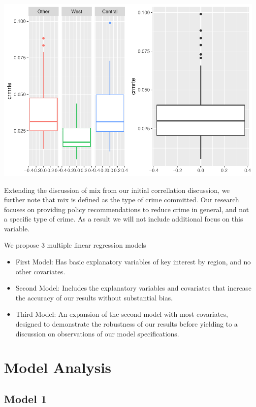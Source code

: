 \documentclass[]{article}
\begin{document}
\includegraphics{Bagnard_Gaustad_Hartman_Leung_Lab_3_files/figure-latex/unnamed-chunk-44-1.pdf}

Extending the discussion of mix from our initial correllation
discussion, we further note that mix is defined as the type of crime
committed. Our research focuses on providing policy recommendations to
reduce crime in general, and not a specific type of crime. As a result
we will not include additional focus on this variable.

We propose 3 multiple linear regression models

\begin{itemize}
\item
  First Model: Has basic explanatory variables of key interest by
  region, and no other covariates.
\item
  Second Model: Includes the explanatory variables and covariates that
  increase the accuracy of our results without substantial bias.
\item
  Third Model: An expansion of the second model with most covariates,
  designed to demonstrate the robustness of our results before yielding
  to a discussion on observations of our model specifications.
\end{itemize}

\hypertarget{model-analysis}{%
\section{Model Analysis}\label{model-analysis}}

\hypertarget{model-1}{%
\subsection{Model 1}\label{model-1}}
\end{document}
